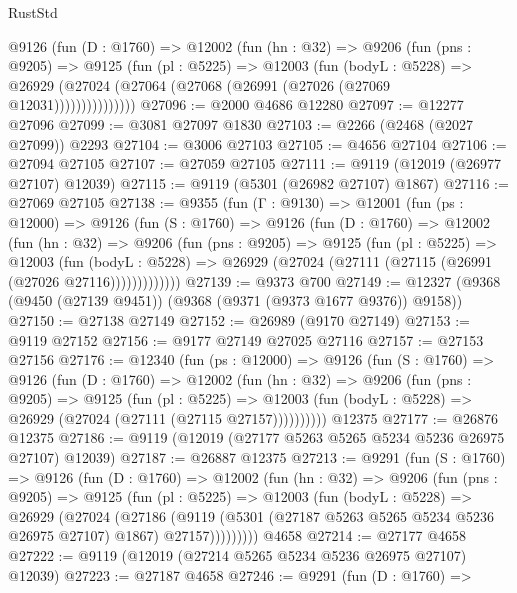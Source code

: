 \begin{lexlean}{RustStd}
\begin{coremodule}
          @9126
            (fun (D : @1760) =>
            @12002
              (fun (hn : @32) =>
              @9206
                (fun (pns : @9205) =>
                @9125
                  (fun (pl : @5225) =>
                  @12003
                    (fun (bodyL : @5228) =>
                    @26929 (@27024 (@27064 (@27068 (@26991 (@27026 (@27069 @12031)))))))))))))))
@27096 := @2000 @4686 @12280
@27097 := @12277 @27096
@27099 := @3081 @27097 @1830
@27103 := @2266 (@2468 (@2027 @27099)) @2293
@27104 := @3006 @27103
@27105 := @4656 @27104
@27106 := @27094 @27105
@27107 := @27059 @27105
@27111 := @9119 (@12019 (@26977 @27107) @12039)
@27115 := @9119 (@5301 (@26982 @27107) @1867)
@27116 := @27069 @27105
@27138 := @9355
    (fun (Γ : @9130) =>
    @12001
      (fun (ps : @12000) =>
      @9126
        (fun (S : @1760) =>
        @9126
          (fun (D : @1760) =>
          @12002
            (fun (hn : @32) =>
            @9206
              (fun (pns : @9205) =>
              @9125
                (fun (pl : @5225) =>
                @12003
                  (fun (bodyL : @5228) =>
                  @26929 (@27024 (@27111 (@27115 (@26991 (@27026 @27116)))))))))))))
@27139 := @9373 @700
@27149 := @12327 (@9368 (@9450 (@27139 @9451)) (@9368 (@9371 (@9373 @1677 @9376)) @9158))
@27150 := @27138 @27149
@27152 := @26989 (@9170 @27149)
@27153 := @9119 @27152
@27156 := @9177 @27149 @27025 @27116
@27157 := @27153 @27156
@27176 := @12340
    (fun (ps : @12000) =>
    @9126
      (fun (S : @1760) =>
      @9126
        (fun (D : @1760) =>
        @12002
          (fun (hn : @32) =>
          @9206
            (fun (pns : @9205) =>
            @9125
              (fun (pl : @5225) =>
              @12003 (fun (bodyL : @5228) => @26929 (@27024 (@27111 (@27115 @27157))))))))))
    @12375
@27177 := @26876 @12375
@27186 := @9119 (@12019 (@27177 @5263 @5265 @5234 @5236 @26975 @27107) @12039)
@27187 := @26887 @12375
@27213 := @9291
    (fun (S : @1760) =>
    @9126
      (fun (D : @1760) =>
      @12002
        (fun (hn : @32) =>
        @9206
          (fun (pns : @9205) =>
          @9125
            (fun (pl : @5225) =>
            @12003
              (fun (bodyL : @5228) =>
              @26929
                (@27024
                  (@27186
                    (@9119
                      (@5301 (@27187 @5263 @5265 @5234 @5236 @26975 @27107) @1867)
                      @27157)))))))))
    @4658
@27214 := @27177 @4658
@27222 := @9119 (@12019 (@27214 @5265 @5234 @5236 @26975 @27107) @12039)
@27223 := @27187 @4658
@27246 := @9291
    (fun (D : @1760) =>

\end{coremodule}
\end{lexlean}
